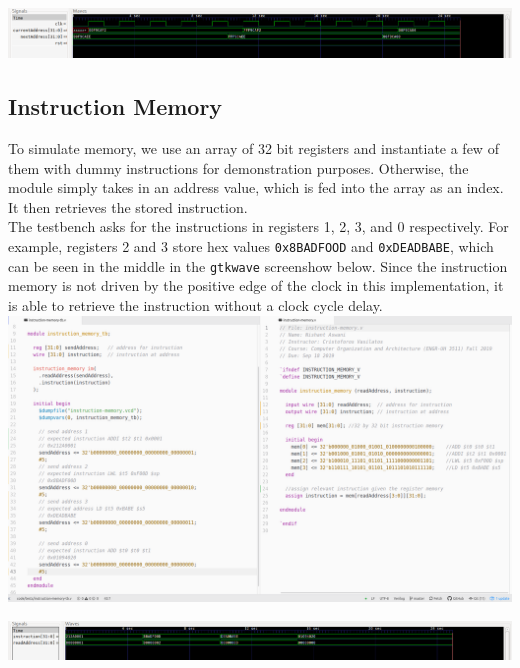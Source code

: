 \documentclass[twocolumn]{article}
\newcommand{\cc}[1]{\texttt{#1}}
\begin{document}
\begingroup
    \centering
    \medskip
    \includegraphics[width=\columnwidth]{Lab-Tex/Lab3-images/program-counter-wave.png}
    \medskip
\endgroup

\subsection{Instruction Memory}

To simulate memory, we use an array of 32 bit registers and instantiate a few of them with dummy instructions for demonstration purposes. Otherwise, the module simply takes in an address value, which is fed into the array as an index. It then retrieves the stored instruction. \\

The testbench asks for the instructions in registers 1, 2, 3, and 0 respectively. For example, registers 2 and 3 store hex values \cc{0x8BADFOOD} and \cc{0xDEADBABE}, which can be seen in the middle in the \cc{gtkwave} screenshow below. Since the instruction memory is not driven by the positive edge of the clock in this implementation, it is able to retrieve the instruction without a clock cycle delay. \\

\begingroup
    \centering
    \medskip
    \includegraphics[width=\columnwidth]{Lab-Tex/Lab3-images/instruction-memory.png}
    \medskip
\endgroup
\medskip

\begingroup
    \centering
    \medskip
    \includegraphics[width=\columnwidth]{Lab-Tex/Lab3-images/instruction-memory-waveform.png}
    \medskip
\endgroup
\end{document}
